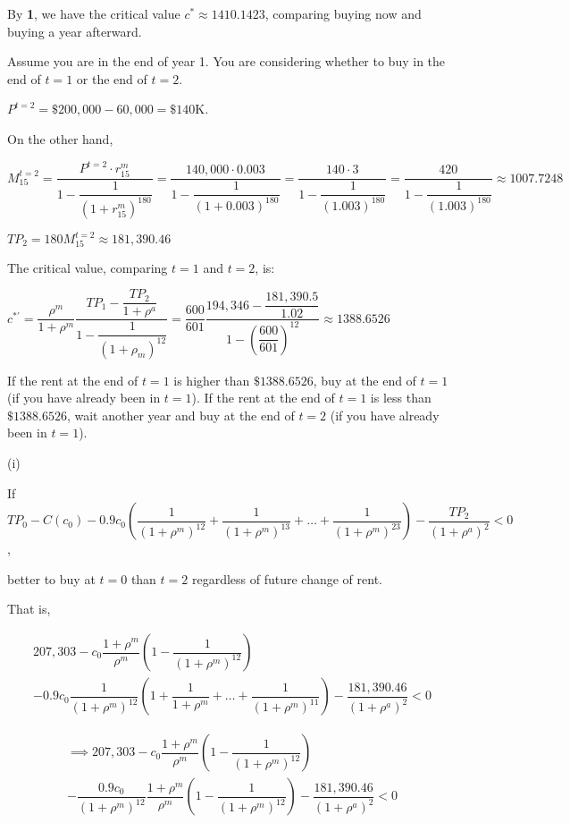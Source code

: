 \documentclass{article}
\begin{document}
By \textbf{1}, we have the critical value $c^{*}\approx1410.1423$, comparing buying now and buying a year afterward.

Assume you are in the end of year 1. You are considering whether to buy in the end of $t=1$ or the end of $t=2$.

$P^{t=2}=\$200,000-60,000=\$140$K.

On the other hand,

$M^{t=2}_{15}=\dfrac{P^{t=2}\cdot r^{m}_{15}}{1-\dfrac{1}{\left(1+r^{m}_{15}\right)^{180}}}=\dfrac{140,000\cdot 0.003}{1-\dfrac{1}{\left(1+0.003\right)^{180}}}=\dfrac{140\cdot 3}{1-\dfrac{1}{\left(1.003\right)^{180}}}=\dfrac{420}{1-\dfrac{1}{\left(1.003\right)^{180}}}\approx1007.7248$

$TP_{2}=180M^{t=2}_{15}\approx181,390.46$

The critical value, comparing $t=1$ and $t=2$, is:

$c^{*\prime}=\dfrac{\rho^{m}}{1+\rho^{m}}\dfrac{TP_{1}-\dfrac{TP_{2}}{1+\rho^{a}}}{1-\dfrac{1}{\left(1+\rho_{m}\right)^{12}}}=\dfrac{600}{601}\dfrac{194,346-\dfrac{181,390.5}{1.02}}{1-\left(\dfrac{600}{601}\right)^{12}}\approx\boxed{1388.6526}$

If the rent at the end of $t=1$ is higher than $\$1388.6526$, buy at the end of $t=1$ (if you have already been in $t=1$). If the rent at the end of $t=1$ is less than $\$1388.6526$, wait another year and buy at the end of $t=2$ (if you have already been in $t=1$). 

\newpage

(i)

If $TP_{0}-C\left(c_{0}\right)-0.9c_{0}\left(\dfrac{1}{\left(1+\rho^{m}\right)^{12}}+\dfrac{1}{\left(1+\rho^{m}\right)^{13}}+\dots+\dfrac{1}{\left(1+\rho^{m}\right)^{23}}\right)-\dfrac{TP_{2}}{\left(1+\rho^{a}\right)^{2}}<0$, 

better to buy at $t=0$ than $t=2$ regardless of future change of rent.

That is,

\begin{multline*}
    207,303-c_{0}\dfrac{1+\rho^{m}}{\rho^{m}}\left(1-\dfrac{1}{\left(1+\rho^{m}\right)^{12}}\right)\\
    -0.9c_{0}\dfrac{1}{\left(1+\rho^{m}\right)^{12}}\left(1+\dfrac{1}{1+\rho^{m}}+\dots+\dfrac{1}{\left(1+\rho^{m}\right)^{11}}\right)-\dfrac{181,390.46}{\left(1+\rho^{a}\right)^{2}}<0
\end{multline*}

\begin{multline*}
    \implies207,303-c_{0}\dfrac{1+\rho^{m}}{\rho^{m}}\left(1-\dfrac{1}{\left(1+\rho^{m}\right)^{12}}\right)\\
    -\dfrac{0.9c_{0}}{\left(1+\rho^{m}\right)^{12}}\dfrac{1+\rho^{m}}{\rho^{m}}\left(1-\dfrac{1}{\left(1+\rho^{m}\right)^{12}}\right)-\dfrac{181,390.46}{\left(1+\rho^{a}\right)^{2}}<0
\end{multline*}
\end{document}
